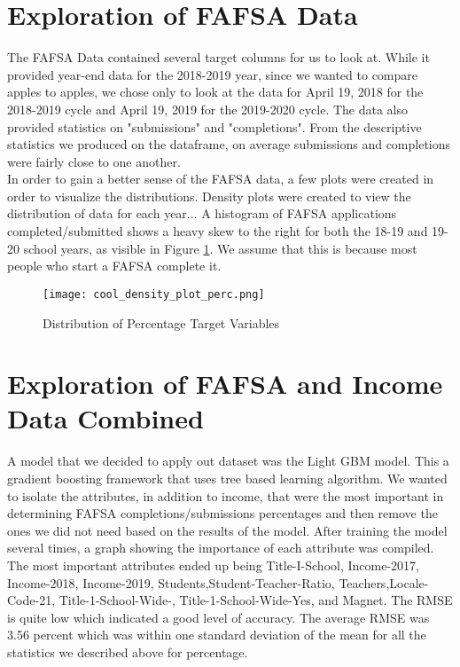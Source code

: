 \documentclass[12pt]{article}
\begin{document}
\section{Exploration of FAFSA Data}

The FAFSA Data contained several target columns for us to look at. While it 
provided year-end data for the 2018-2019 year, since we wanted to compare
apples to apples, we chose only to look at the data for April 19, 2018 for the
2018-2019 cycle and April 19, 2019 for the 2019-2020 cycle. The data also provided
statistics on "submissions" and "completions". From the descriptive statistics we
produced on the dataframe, on average submissions and completions were fairly close
to one another.\\

In order to gain a better sense of the FAFSA data, a few plots were created in 
order to visualize the distributions. Density plots were created to view the 
distribution of data for each year... A histogram of FAFSA applications 
completed/submitted shows a heavy skew to the right for both the 18-19 and 19-20
school years, as visible in Figure \ref{fig:target_perc}. We assume that this is 
because most people who start a FAFSA complete it.


\begin{figure}[!htb]
  \centering
  \texttt{[image: cool\_density\_plot\_perc.png]}
  \caption{Distribution of Percentage Target Variables}
  \label{fig:target_perc}
\end{figure}

\section{Exploration of FAFSA and Income Data Combined}
A model that we decided to apply out dataset was the Light GBM model. This a gradient boosting framework that uses tree based learning algorithm. We wanted to isolate the attributes, in addition to income, that were the most important in determining FAFSA completions/submissions percentages and then remove the ones we did not need based on the results of the model. After training the model several times, a graph showing the importance of each attribute was compiled. The most important attributes ended up being Title-I-School, Income-2017, Income-2018, Income-2019, Students,Student-Teacher-Ratio, Teachers,Locale-Code-21, Title-1-School-Wide-, Title-1-School-Wide-Yes, and Magnet. The RMSE is quite low which indicated a good level of accuracy. The average RMSE was 3.56 percent which was within one standard deviation of the mean for all the statistics we described above for percentage.
\end{document}
